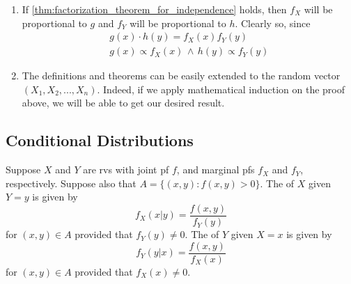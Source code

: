 \documentclass[notoc,notitlepage]{tufte-book}
\begin{document}
\begin{note}
  \begin{enumerate}
    \item If \cref{thm:factorization_theorem_for_independence} holds, then $f_X$ will be proportional to $g$ and $f_Y$ will be proportional to $h$. Clearly so, since
      \begin{gather*}
        g(x) \cdot h(y) = f_X(x) f_Y(y) \\
        g(x) \propto f_X(x) \, \land \, h(y) \propto f_Y(y)
      \end{gather*}

    \item The definitions and theorems can be easily extended to the random vector $(X_1, X_2, ..., X_n)$. Indeed, if we apply mathematical induction on the proof above, we will be able to get our desired result.
  \end{enumerate}
\end{note}


\subsection{Conditional Distributions}%
\label{sub:conditional_distributions}

\begin{defn}
\label{defn:conditional_distributions}
  Suppose $X$ and $Y$ are rvs with joint pf $f$, and marginal pfs $f_X$ and $f_Y$, respectively. Suppose also that $A = \{(x, y) : f(x, y) > 0 \}$. The  of $X$ given $Y = y$ is given by
  \begin{equation*}
    f_X(x | y) = \frac{f(x, y)}{f_Y(y)}
  \end{equation*}
  for $(x, y) \in A$ provided that $f_Y(y) \neq 0$. The  of $Y$ given $X = x$ is given by
  \begin{equation*}
    f_Y(y | x) = \frac{f(x, y)}{f_X(x)}
  \end{equation*}
  for $(x, y) \in A$ provided that $f_X(x) \neq 0$.
\end{defn}
\end{document}
